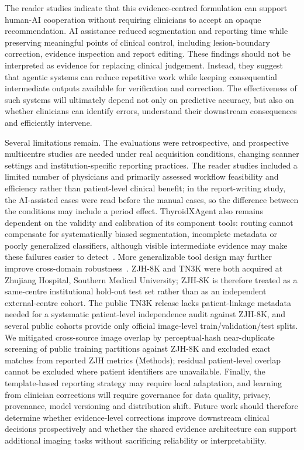 \documentclass[fleqn,10pt]{wlscirep}
\begin{document}
The reader studies indicate that this evidence-centred formulation can support human-AI cooperation without requiring clinicians to accept an opaque recommendation. AI assistance reduced segmentation and reporting time while preserving meaningful points of clinical control, including lesion-boundary correction, evidence inspection and report editing. These findings should not be interpreted as evidence for replacing clinical judgement. Instead, they suggest that agentic systems can reduce repetitive work while keeping consequential intermediate outputs available for verification and correction. The effectiveness of such systems will ultimately depend not only on predictive accuracy, but also on whether clinicians can identify errors, understand their downstream consequences and efficiently intervene.

Several limitations remain. The evaluations were retrospective, and prospective multicentre studies are needed under real acquisition conditions, changing scanner settings and institution-specific reporting practices. The reader studies included a limited number of physicians and primarily assessed workflow feasibility and efficiency rather than patient-level clinical benefit; in the report-writing study, the AI-assisted cases were read before the manual cases, so the difference between the conditions may include a period effect. ThyroidXAgent also remains dependent on the validity and calibration of its component tools: routing cannot compensate for systematically biased segmentation, incomplete metadata or poorly generalized classifiers, although visible intermediate evidence may make these failures easier to detect~\cite{Wiens2019NatMedDoNoHarm,Obermeyer2019ScienceBias}. More generalizable tool design may further improve cross-domain robustness~\cite{gong2025domain,gong2026intermediate}. ZJH-8K and TN3K were both acquired at Zhujiang Hospital, Southern Medical University; ZJH-8K is therefore treated as a same-centre institutional hold-out test set rather than as an independent external-centre cohort. The public TN3K release lacks patient-linkage metadata needed for a systematic patient-level independence audit against ZJH-8K, and several public cohorts provide only official image-level train/validation/test splits. We mitigated cross-source image overlap by perceptual-hash near-duplicate screening of public training partitions against ZJH-8K and excluded exact matches from reported ZJH metrics (Methods); residual patient-level overlap cannot be excluded where patient identifiers are unavailable. Finally, the template-based reporting strategy may require local adaptation, and learning from clinician corrections will require governance for data quality, privacy, provenance, model versioning and distribution shift. Future work should therefore determine whether evidence-level corrections improve downstream clinical decisions prospectively and whether the shared evidence architecture can support additional imaging tasks without sacrificing reliability or interpretability.
\end{document}

